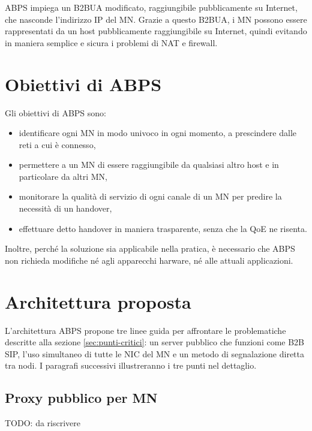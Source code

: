 \documentclass[12pt,a4paper,openright,twoside]{book}
\begin{document}
ABPS impiega un B2BUA modificato, raggiungibile pubblicamente su
Internet, che nasconde l'indirizzo IP del MN. Grazie a questo B2BUA, i
MN possono essere rappresentati da un host pubblicamente raggiungibile
su Internet, quindi evitando in maniera semplice e sicura i problemi
di NAT e firewall.

\section {Obiettivi di ABPS}

Gli obiettivi di ABPS sono:

\begin{itemize}
\item identificare ogni MN in modo univoco in ogni momento, a
  prescindere dalle reti a cui è connesso,
\item permettere a un MN di essere raggiungibile da qualsiasi altro
  host e in particolare da altri MN,
\item monitorare la qualità di servizio di ogni canale di un MN per
  predire la necessità di un handover,
\item effettuare detto handover in maniera trasparente, senza che la
  QoE ne risenta.
\end{itemize}

Inoltre, perché la soluzione sia applicabile nella pratica, è
necessario che ABPS non richieda modifiche né agli apparecchi harware,
né alle attuali applicazioni.

\section {Architettura proposta}
L'architettura ABPS propone tre linee guida per affrontare le
problematiche descritte alla sezione \ref{sec:punti-critici}: un
server pubblico che funzioni come B2B SIP, l'uso simultaneo di tutte
le NIC del MN e un metodo di segnalazione diretta tra nodi. I
paragrafi successivi illustreranno i tre punti nel dettaglio.

\subsection{Proxy pubblico per MN}
TODO: da riscrivere
\end{document}
